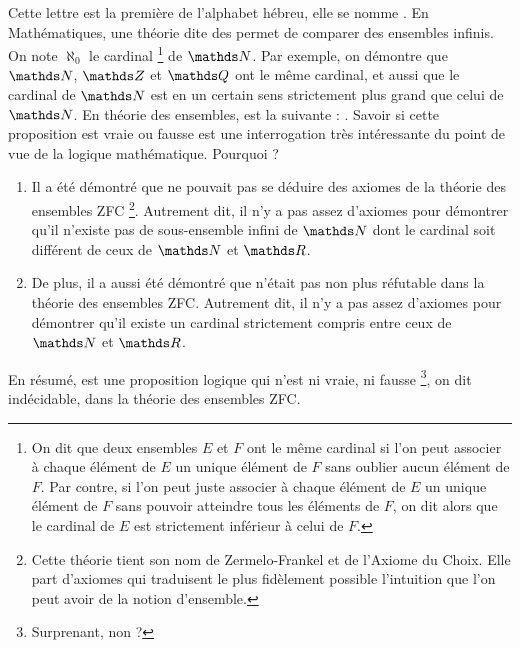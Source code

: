 
\cadre{$\aleph$} Cette lettre est  la première de l'alphabet hébreu, elle se nomme . En Mathématiques, une théorie dite des  permet de comparer des ensembles infinis. On note $\aleph_0$ le cardinal
	\footnote{On dit que deux ensembles $E$ et $F$  ont le même cardinal si l'on peut associer à chaque élément de $E$ un unique élément de $F$ sans oublier aucun élément de $F$. Par contre, si l'on peut juste associer à chaque élément de $E$ un unique élément de $F$ sans pouvoir atteindre tous les éléments de $F$, on dit alors que le cardinal de $E$ est strictement inférieur à celui de $F$. }
	de $\NN$. Par exemple, on démontre que $\NN$, $\ZZ$ et $\QQ$ ont le même cardinal, et aussi que le cardinal de $\NN$ est en un certain sens strictement plus grand que celui de $\NN$.
	En théorie des ensembles,  est la suivante : . Savoir si cette proposition est vraie ou fausse est une interrogation très intéressante du point de vue de la logique mathématique. Pourquoi ? 

\begin{enumerate}
	\item Il a été démontré que  ne pouvait pas se déduire des axiomes de la théorie des ensembles ZFC
		\footnote{Cette théorie tient son nom de Zermelo-Frankel et de l'Axiome du Choix. Elle part d'axiomes qui traduisent le plus fidèlement possible l'intuition que l'on peut avoir de la notion d'ensemble.}.
	Autrement dit, il n'y a pas assez d'axiomes pour démontrer qu'il n'existe pas de sous-ensemble infini de $\NN$ dont le cardinal soit différent de ceux de $\NN$ et $\RR$.
	
	\item De plus, il a aussi été démontré que  n'était pas non plus réfutable dans la théorie des ensembles ZFC.
	Autrement dit, il n'y a pas assez d'axiomes pour démontrer qu'il existe un cardinal strictement compris entre ceux de $\NN$ et $\RR$.
\end{enumerate}

\noindent En résumé,  est une proposition logique qui n'est ni vraie, ni fausse 
	\footnote{Surprenant, non ?},
on dit indécidable, dans la théorie des ensembles ZFC.
